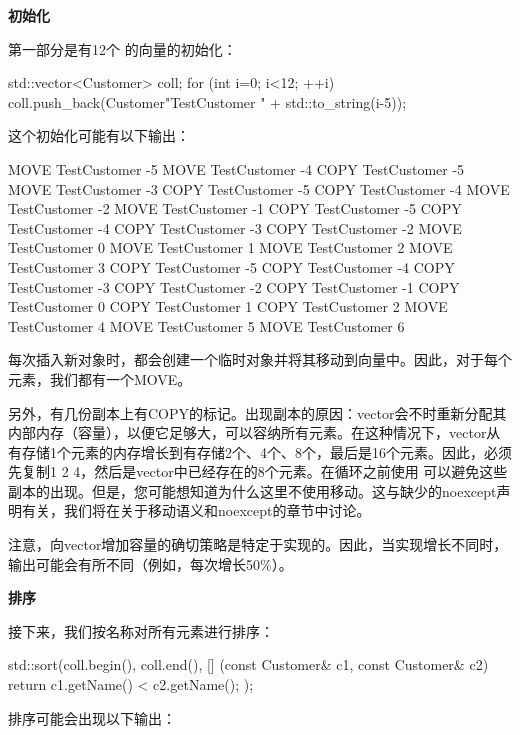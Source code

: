 \textbf{初始化}

第一部分是有12个  的向量的初始化：

\begin{cppcode}
std::vector<Customer> coll;
for (int i=0; i<12; ++i) {
	coll.push_back(Customer{"TestCustomer " + std::to_string(i-5)});
}
\end{cppcode}

这个初始化可能有以下输出：

\begin{outputcode}
MOVE TestCustomer -5
MOVE TestCustomer -4
COPY TestCustomer -5
MOVE TestCustomer -3
COPY TestCustomer -5
COPY TestCustomer -4
MOVE TestCustomer -2
MOVE TestCustomer -1
COPY TestCustomer -5
COPY TestCustomer -4
COPY TestCustomer -3
COPY TestCustomer -2
MOVE TestCustomer 0
MOVE TestCustomer 1
MOVE TestCustomer 2
MOVE TestCustomer 3
COPY TestCustomer -5
COPY TestCustomer -4
COPY TestCustomer -3
COPY TestCustomer -2
COPY TestCustomer -1
COPY TestCustomer 0
COPY TestCustomer 1
COPY TestCustomer 2
MOVE TestCustomer 4
MOVE TestCustomer 5
MOVE TestCustomer 6
\end{outputcode}

每次插入新对象时，都会创建一个临时对象并将其移动到向量中。因此，对于每个元素，我们都有一个MOVE。

另外，有几份副本上有COPY的标记。出现副本的原因：vector会不时重新分配其内部内存（容量），以便它足够大，可以容纳所有元素。在这种情况下，vector从有存储1个元素的内存增长到有存储2个、4个、8个，最后是16个元素。因此，必须先复制1 2 4，然后是vector中已经存在的8个元素。在循环之前使用  可以避免这些副本的出现。但是，您可能想知道为什么这里不使用移动。这与缺少的noexcept声明有关，我们将在关于移动语义和noexcept的章节中讨论。

注意，向vector增加容量的确切策略是特定于实现的。因此，当实现增长不同时，输出可能会有所不同（例如，每次增长50\%）。

\textbf{排序}

接下来，我们按名称对所有元素进行排序：

\begin{cppcode}
std::sort(coll.begin(), coll.end(),
	[] (const Customer& c1, const Customer& c2) {
		return c1.getName() < c2.getName();
	});
\end{cppcode}

排序可能会出现以下输出：


